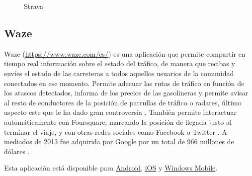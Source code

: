 \begin{figure}[h!btp]
	\begin{adjustbox}{minipage=\linewidth, fbox}
		\centering
		\hspace{10mm}
	\end{adjustbox}
\caption{Strava}
	\label{fig:strava}
\end{figure}

\subsection{Waze}
Waze (\url{https://www.waze.com/es/}) es una aplicación que permite compartir en tiempo real información sobre el estado del tráfico, de manera que recibas y envíes el estado de las carreteras a todos aquellos usuarios de la comunidad conectados en ese momento. Permite adecuar las rutas de tráfico en función de los atascos detectados, informa de los precios de las gasolineras y permite avisar al resto de conductores de la posición de patrullas de tráfico o radares, último aspecto este que le ha dado gran controversia \cite{Cast13}. También permite interactuar automáticamente con Foursquare, marcando la posición de llegada justo al terminar el viaje, y con otras redes sociales como Facebook o Twitter \cite{Pen11}. A mediados de 2013 fue adquirida por Google por un total de 966 millones de dólares \cite{ABC13}.

Esta aplicación está disponible para \href{https://play.google.com/store/apps/details?id=com.waze}{Android}, \href{https://itunes.apple.com/us/app/waze-social-gps-traffic/id323229106?mt=8}{iOS} y \href{https://www.microsoft.com/es-es/store/apps/waze/9wzdncrfj2m3}{Windows Mobile}.

